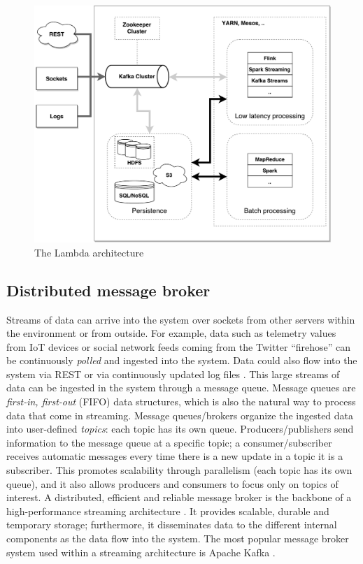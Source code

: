  \begin{figure}[ht!]
\includegraphics[width=1\textwidth]{images/streaming_architecture.pdf}
 \caption{The Lambda architecture}
\label{fig:lambda_architecture}
\end{figure}

\subsection{Distributed message broker}
Streams of data can arrive into the system over sockets from other servers within the environment or from outside. For example, data such as telemetry values from IoT devices or social network feeds coming from the Twitter “firehose” can be continuously \emph{polled} and ingested into the system. Data could also flow into the system via REST or via continuously updated log files \cite{fastdataarchitecture}. This large streams of data can be ingested in the system through a message queue. Message queues are \emph{first-in, first-out} (FIFO) data structures, which is also the natural way to process data that come in streaming. Message queues/brokers organize the ingested data into user-defined \emph{topics}: each topic has its own queue. Producers/publishers send information to the message queue at a specific topic; a consumer/subscriber receives automatic messages every time there is a new update in a topic it is a subscriber. This promotes scalability through parallelism (each topic has its own queue), and it also allows producers and consumers to focus only on topics of interest. A distributed, efficient and reliable message broker is the backbone of a high-performance streaming architecture \cite{fastdataarchitecture}. It provides scalable, durable and temporary storage; furthermore, it disseminates data to the different internal components as the data flow into the system. The most popular message broker system used within a streaming architecture is Apache Kafka \cite{apachekafkaonline}. 
